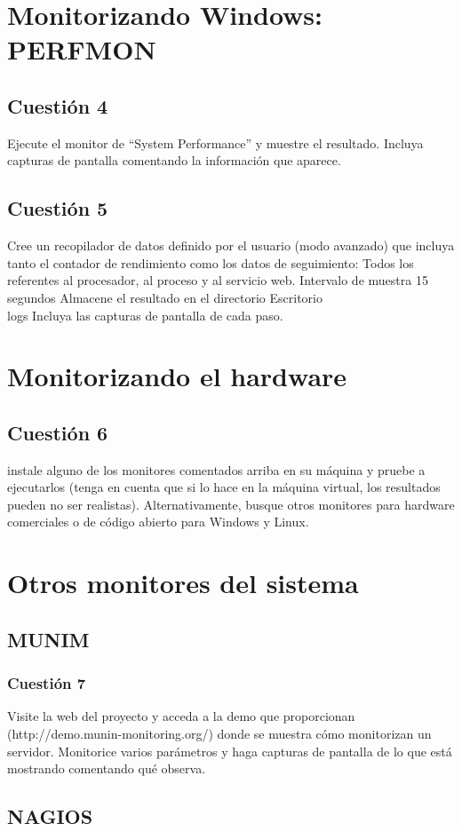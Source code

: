 \section{Monitorizando Windows: PERFMON}
\subsection{Cuestión 4}
Ejecute el monitor de “System Performance” y muestre el
resultado. Incluya capturas de pantalla comentando la información que
aparece.
\subsection{Cuestión 5}
Cree un recopilador de datos definido por el usuario (modo
avanzado) que incluya tanto el contador de rendimiento como los datos de
seguimiento:
Todos los referentes al procesador, al proceso y al servicio web.
Intervalo de muestra 15 segundos
Almacene el resultado en el directorio Escritorio\\logs
Incluya las capturas de pantalla de cada paso.
\section{Monitorizando el hardware}
\subsection{Cuestión 6}
instale alguno de los monitores comentados arriba en su
máquina y pruebe a ejecutarlos (tenga en cuenta que si lo hace en la
máquina virtual, los resultados pueden no ser realistas). Alternativamente,
busque otros monitores para hardware comerciales o de código abierto para
Windows y Linux.
\section{Otros monitores del sistema}
\subsection{MUNIM}
\subsubsection{Cuestión 7}
Visite la web del proyecto y acceda a la demo que
proporcionan (http://demo.munin-monitoring.org/) donde se muestra cómo
monitorizan un servidor. Monitorice varios parámetros y haga capturas de
pantalla de lo que está mostrando comentando qué observa.
\subsection{NAGIOS}
